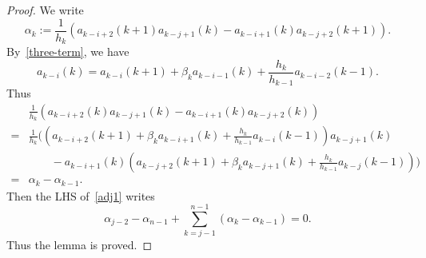 \documentclass[a4paper]{article}
\theoremstyle{plain}
\theoremstyle{definition}
\newcommand{\nn}{\nonumber}
\begin{document}
\begin{proof}
	We write
	\begin{equation}
		\alpha_k:=\frac{1}{h_k}(a_{k-i+2}(k+1)a_{k-j+1}(k)-a_{k-i+1}(k)a_{k-j+2}(k+1)).
	\end{equation} By~\eqref{three-term}, we have
	\begin{equation}
		a_{k-i}(k)=a_{k-i}(k+1)+\beta_ka_{k-i-1}(k)+\frac{h_k}{h_{k-1}}a_{k-i-2}(k-1).
	\end{equation}
	Thus
	\begin{align}
		&\frac{1}{h_k}(a_{k-i+2}(k)a_{k-j+1}(k)-a_{k-i+1}(k)a_{k-j+2}(k))\nn\\
		=&\frac{1}{h_k}\biggl(\left(a_{k-i+2}(k+1)+\beta_ka_{k-i+1}(k)+\frac{h_k}{h_{k-1}}a_{k-i}(k-1)\right)a_{k-j+1}(k)\nn\\
		&\qquad-a_{k-i+1}(k)\left(a_{k-j+2}(k+1)+\beta_ka_{k-j+1}(k)+\frac{h_k}{h_{k-1}}a_{k-j}(k-1)\right)\biggr)\nn\\
		=&\alpha_k-\alpha_{k-1}.
	\end{align}
	Then the LHS of~\eqref{adj1} writes
	\begin{equation}
		\alpha_{j-2}-\alpha_{n-1}+\sum_{k=j-1}^{n-1}(\alpha_k-\alpha_{k-1})=0.
	\end{equation}
	Thus the lemma is proved.
\end{proof}
\end{document}
